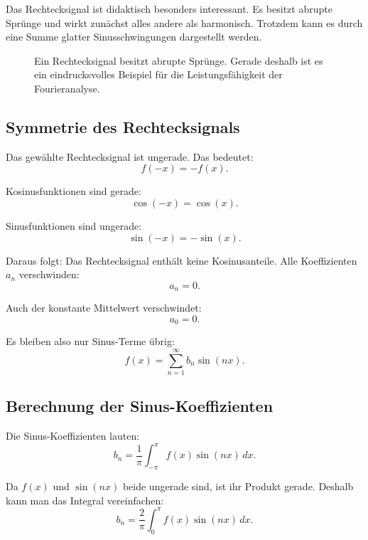 Das Rechtecksignal ist didaktisch besonders interessant.
Es besitzt abrupte Sprünge und wirkt zunächst alles andere als harmonisch.
Trotzdem kann es durch eine Summe glatter Sinusschwingungen dargestellt werden.

\begin{figure}[htbp]
	\centering
	\caption{Ein Rechtecksignal besitzt abrupte Sprünge.
		Gerade deshalb ist es ein eindrucksvolles Beispiel für die Leistungsfähigkeit der Fourieranalyse.}
	\label{fig:rechtecksignal}
\end{figure}

\subsection{Symmetrie des Rechtecksignals}

Das gewählte Rechtecksignal ist ungerade.
Das bedeutet:
\[
f(-x)=-f(x).
\]

Kosinusfunktionen sind gerade:
\[
\cos(-x)=\cos(x).
\]

Sinusfunktionen sind ungerade:
\[
\sin(-x)=-\sin(x).
\]

Daraus folgt:
Das Rechtecksignal enthält keine Kosinusanteile.
Alle Koeffizienten \(a_n\) verschwinden:
\[
a_n=0.
\]

Auch der konstante Mittelwert verschwindet:
\[
a_0=0.
\]

Es bleiben also nur Sinus-Terme übrig:
\[
f(x)=\sum_{n=1}^{\infty} b_n\sin(nx).
\]

\subsection{Berechnung der Sinus-Koeffizienten}

Die Sinus-Koeffizienten lauten:
\[
b_n=\frac{1}{\pi}\int_{-\pi}^{\pi}f(x)\sin(nx)\,dx.
\]

Da \(f(x)\) und \(\sin(nx)\) beide ungerade sind,
ist ihr Produkt gerade.
Deshalb kann man das Integral vereinfachen:
\[
b_n=\frac{2}{\pi}\int_{0}^{\pi}f(x)\sin(nx)\,dx.
\]

